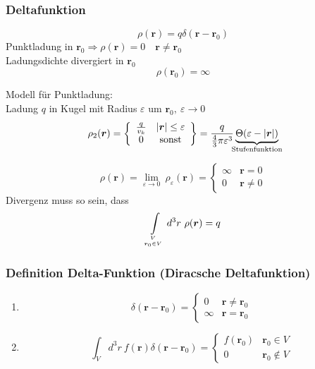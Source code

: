 \documentclass[titlepage,11pt,a4paper,ngerman]{report}
\newcommand{\delfkt}{\delta(\vec{r} - \vec{r}_0)}
\renewcommand{\vec}[1]{\boldsymbol{#1}}
\renewcommand{\epsilon}{\varepsilon}
\renewcommand{\paragraph}[1]{\subsubsection{#1}}
\begin{document}
\begin{minipage}{.6\linewidth}
	\paragraph{Deltafunktion}
	
	$$\rho (\vec{r}) = q \delta(\vec{r}-\vec{r}_0)$$
	Punktladung in $\vec{r}_0 \Rightarrow \rho(\vec{r}) = 0 \quad \vec{r} \neq \vec{r}_0$\\
	Ladungsdichte divergiert in $\vec{r}_0$
	$$\rho(\vec{r}_0) = \infty$$
\end{minipage}
\begin{minipage}{.4\linewidth}
	\centering
\end{minipage}

Modell für Punktladung:\\
Ladung $q$ in Kugel mit Radius $\epsilon$  um $\vec{r}_0,\ \epsilon \rightarrow 0$
$$\rho_2 (\vec{r}) = \left\{ \begin{array}{cc}
\frac{q}{v_k} & |\vec{r}| \leq \epsilon\\
0 & \textrm{sonst}	
\end{array} \right\} = \frac{q}{\frac{4}{3}\pi \epsilon^3}\underbrace{\Theta (\epsilon - |\vec{r}|)}_{\mathclap{\textrm{Stufenfunktion}}}$$




$$\rho(\vec{r}) = \lim_{\epsilon \rightarrow 0}\ \rho_\epsilon (\vec{r}) = \left\{ \begin{array}{cc}
\infty & \vec{r} = 0\\
0 & \vec{r} \neq 0
\end{array}\right.$$
Divergenz muss so sein, dass $$ \int\limits_{V \atop \vec{r}_0 \in V} d^3r\ \rho(\vec{r}) = q$$

\paragraph{Definition Delta-Funktion (Diracsche Deltafunktion)}

\begin{enumerate}
	\item 
	$$\delta (\vec{r} - \vec{r}_0) = \left\{ \begin{array}{cc}
		0 & \vec{r} \neq \vec{r}_0 \\
		\infty & \vec{r} = \vec{r}_0
	\end{array}\right.$$
	\item 
	$$\int_V d^3 r\ f(\vec{r}) \delfkt = \left\{ \begin{array}{cc}
		f(\vec{r}_0) & \vec{r}_0 \in V\\
		0 & \vec{r}_0 \notin V
	\end{array}\right.$$ 
\end{enumerate}
\end{document}
